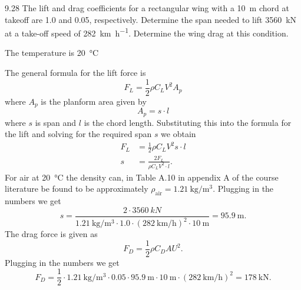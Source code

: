 
\begin{problem}{9.28}
  The lift and drag coefficients for a rectangular wing with a \qty{10}{\m} chord at takeoff are \num{1,0} and \num{0,05}, respectively.
  Determine the span needed to lift \qty{3560}{\kN} at a take-off speed of \qty{282}{\km\per\hour}.
  Determine the wing drag at this condition.
\end{problem}

\begin{assumptions}
  \item The temperature is \qty{20}{\celsius} 
\end{assumptions}

\begin{derivation}
  The general formula for the lift force is
  \begin{equation*}
    F_L = \frac{1}{2} \rho C_L V^2 A_p
  \end{equation*}
  where $A_p$ is the planform area given by
  \begin{equation*}
    A_p = s \cdot l
  \end{equation*}
  where $s$ is span and $l$ is the chord length.
  Substituting this into the formula for the lift and solving for the required span $s$ we obtain
  \begin{align*}
    F_L &= \frac{1}{2} \rho C_L V^2 s \cdot l \\
    s &= \frac{2F_L}{\rho C_L V^2 \cdot l}
  .\end{align*}
  For air at \qty{20}{\celsius} the density can, in Table A.10 in appendix A of the course literature be found to be approximately $\rho_{\text{air}} = \qty{1,21}{\kg\per\cubic\m}$.
  Plugging in the numbers we get
  \begin{equation*}
    s = \frac{2 \cdot \qty{3560}{kN}}{\qty{1,21}{\kg\per\cubic\m} \cdot \num{1,0} \cdot \left( \qty{282}{\km\per\hour}  \right)^2 \cdot \qty{10}{\m} } = \qty{95,9}{\m}
  .\end{equation*}
  The drag force is given as
  \begin{equation*}
    F_D = \frac{1}{2}\rho C_D A U^2
  .\end{equation*}
  Plugging in the numbers we get
  \begin{equation*}
    F_D = \frac{1}{2} \cdot \qty{1,21}{\kg\per\cubic\m} \cdot \num{0,05} \cdot \qty{95,9}{\m} \cdot \qty{10}{\m} \cdot \left( \qty{282}{\km\per\hour}  \right)^2 = \qty{178}{\kN} 
  .\end{equation*}
\end{derivation}

